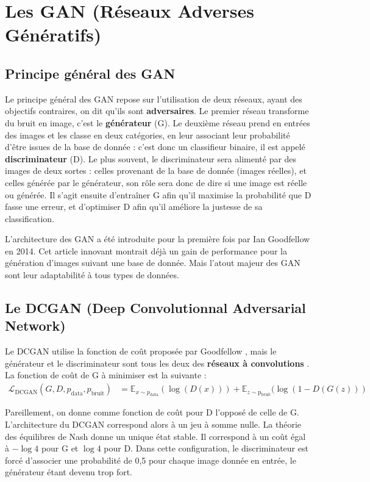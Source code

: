 
\chapter{Les GAN (Réseaux Adverses Génératifs)}

\section{Principe général des GAN}
Le principe général des GAN repose sur l'utilisation de deux réseaux, ayant des objectifs contraires, on dit qu'ils sont \textbf{adversaires}. Le premier réseau transforme du bruit en image, c'est le \textbf{générateur} (G). Le deuxième réseau prend en entrées des images et les classe en deux catégories, en leur associant leur probabilité d'être issues de la base de donnée : c'est donc un classifieur binaire, il est appelé \textbf{discriminateur} (D). Le plus souvent, le discriminateur sera alimenté par des images de deux sortes : celles provenant de la base de donnée (images réelles), et celles générée par le générateur, son rôle sera donc de dire si une image est réelle ou générée. Il s'agit ensuite d'entraîner G afin qu'il maximise la probabilité que D fasse une erreur, et d'optimiser D afin qu'il améliore la justesse de sa classification.

L'architecture des GAN a été introduite pour la première fois par Ian Goodfellow \cite{goodfellow_generative_2014} en 2014. Cet article innovant montrait déjà un gain de performance pour la génération d'images suivant une base de donnée. Mais l'atout majeur des GAN sont leur adaptabilité à tous types de données.


\section{Le DCGAN (Deep Convolutionnal Adversarial Network)}
Le DCGAN utilise la fonction de coût proposée par Goodfellow \cite{goodfellow_generative_2014}, mais le générateur et le discriminateur sont tous les deux des \textbf{réseaux à convolutions} \cite{radford_unsupervised_2015-1}. La fonction de coût de G à minimiser est la suivante : $$\begin{aligned}
\mathcal{L}_{\mathrm{DCGAN}}\left(G, D, p_{\mathrm{data}}, p_{\mathrm{bruit}}\right) &=
   \mathbb{E}_{x \sim p_{\mathrm{data}}}(\log (D(x))) + \mathbb{E}_{z \sim \mathrm{p_{bruit}}}(\log (1 - D(G(z)))
\end{aligned}$$

Pareillement, on donne comme fonction de coût pour D l'opposé de celle de G. L'architecture du DCGAN correspond alors à un jeu à somme nulle. La théorie des équilibres de Nash donne un unique état stable. Il correspond à un coût égal à $-\log 4$ pour G et $ \log 4$ pour D. Dans cette configuration, le discriminateur est forcé d'associer une probabilité de 0,5 pour chaque image donnée en entrée, le générateur étant devenu trop fort.

